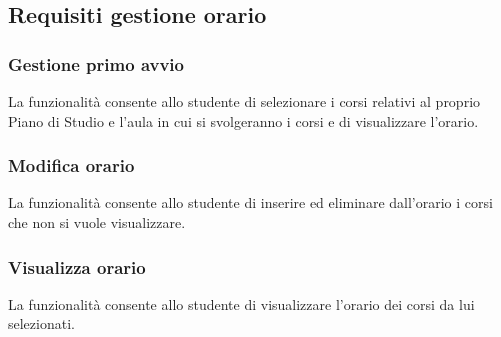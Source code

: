 \subsection{Requisiti gestione orario}

\subsubsection{Gestione primo avvio}

La funzionalità consente allo studente di selezionare i corsi relativi al proprio Piano di Studio e l’aula in cui si svolgeranno i corsi e di visualizzare l'orario. 

\subsubsection{Modifica orario}

La funzionalità consente allo studente di inserire ed eliminare dall’orario i corsi che non si vuole visualizzare. 

\subsubsection{Visualizza orario}

La funzionalità consente allo studente di visualizzare l’orario dei corsi da lui selezionati.